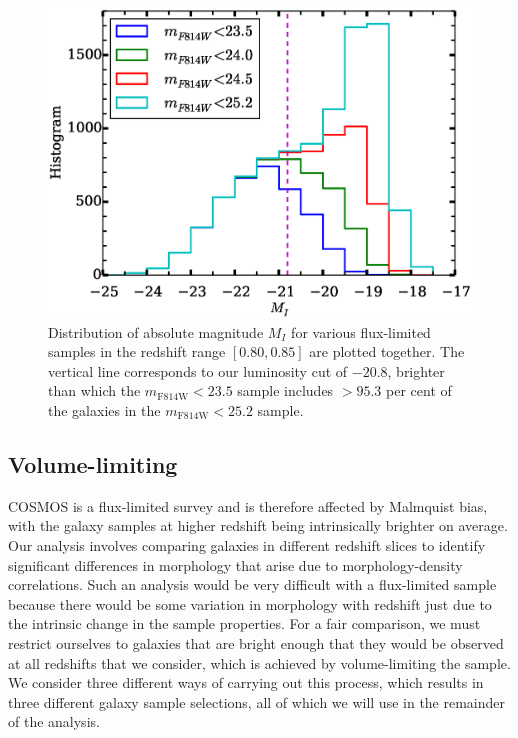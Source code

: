 \documentclass[twocolumn,useAMS,usenatbib]{mn2e}
\newcommand{\rachel}[1]{{\textcolor{red}{#1}}}
\begin{document}
\begin{figure}
  \centering
   \includegraphics[width=\columnwidth]{MAG_histograms}
   \caption{Distribution of absolute magnitude $M_I$ for various
     flux-limited samples in the redshift range $[0.80, 0.85]$ are plotted together. The vertical line
     corresponds to our luminosity cut of $-20.8$, brighter than which
     the $m_\text{F814W}<23.5$ sample includes $>95.3$ per cent of the
     galaxies in the $m_\text{F814W}<25.2$ sample.
   }
   \label{fig:MIhist}
 \end{figure}


\subsection{Volume-limiting}
\label{sub:volumelimiting}
 
COSMOS is a flux-limited survey and is therefore affected by Malmquist
bias, with the galaxy samples at higher redshift being intrinsically
brighter on average.  
Our analysis involves comparing galaxies in different redshift slices
to identify significant differences in morphology that arise due to
morphology-density correlations.  Such an analysis would be very
difficult with a flux-limited sample because there would be some
variation in morphology with redshift just due to the intrinsic change
in the sample properties.  For a fair comparison, we must restrict
ourselves to galaxies that are bright enough that they would be
observed at all redshifts that we consider, which is achieved by
volume-limiting the sample.  We consider three different ways of
carrying out this process, which results in three different galaxy
sample selections, all of which we will use in the remainder of the
analysis.
\end{document}
